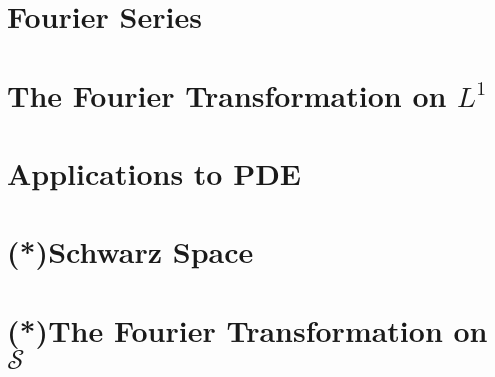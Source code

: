 \section{Fourier Series}
\section{The Fourier Transformation on $L^{1}$}
\section{Applications to PDE}
\section{(*)Schwarz Space}
\section{(*)The Fourier Transformation on $\mathscr{S}$}